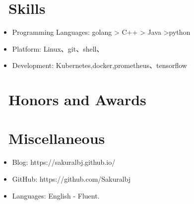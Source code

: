 \documentclass{resume}
\begin{document}
\section{\faCogs\ Skills}
\begin{itemize}[parsep=0.5ex]
  \item Programming Languages: golang  > C++ > Java >python
  \item Platform: Linux、git、shell、
  \item Development: Kubernetes,docker,prometheus、tensorflow
\end{itemize}

\section{\faHeartO\ Honors and Awards}

\section{\faInfo\ Miscellaneous}
\begin{itemize}[parsep=0.5ex]
  \item Blog: https://sakuralbj.github.io/
  \item GitHub: https://github.com/Sakuralbj
  \item Languages: English - Fluent.
\end{itemize}

%
%
\end{document}
